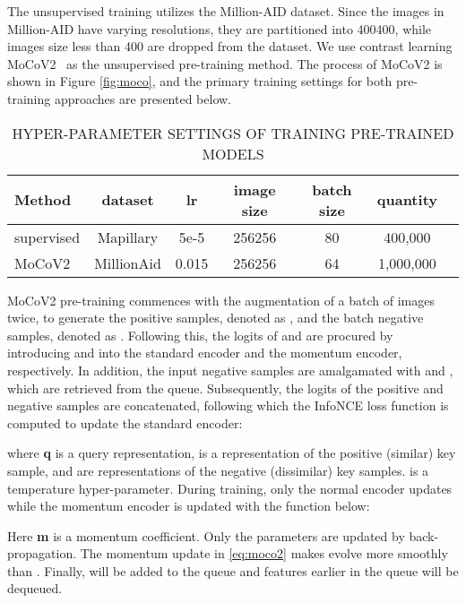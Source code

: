\documentclass[journal]{IEEEtran}
\begin{document}
The unsupervised training utilizes the Million-AID dataset. Since the images in Million-AID have varying resolutions, they are partitioned into 400400, while images size less than 400 are dropped from the dataset. We use contrast learning MoCoV2~\cite{he2020momentum} as the unsupervised pre-training method. The process of MoCoV2 is shown in Figure \ref{fig:moco}, and the primary training settings for both pre-training approaches are presented below.

\begin{table}[!ht]
  \begin{center}
  \scriptsize
    \caption{HYPER-PARAMETER SETTINGS OF TRAINING PRE-TRAINED MODELS}
    \begin{tabular}{l|c c c c c c}
        \hline
      \textbf{Method} & \textbf{dataset} & \textbf{lr} & 
      \textbf{image size} & \textbf{batch size} & \textbf{quantity}\\
      \hline
      supervised & Mapillary & 5e-5 & 256256 & 80 & 400,000\\
      MoCoV2 & MillionAid & 0.015 & 256256 & 64 & 1,000,000\\
      \hline
    \end{tabular}
  \end{center}
  \label{table:2}
\end{table}

MoCoV2 pre-training commences with the augmentation of a batch of images twice, to generate the positive samples, denoted as , and the batch negative samples, denoted as . Following this, the logits of  and  are procured by introducing  and  into the standard encoder and the momentum encoder, respectively. In addition, the input negative samples are amalgamated with  and , which are retrieved from the queue. Subsequently, the logits of the positive and negative samples are concatenated, following which the InfoNCE loss function is computed to update the standard encoder:


where \textbf{q} is a query representation,  is a representation of the positive (similar) key sample, and  are representations of the negative (dissimilar) key samples.  is a temperature hyper-parameter. During training, only the normal encoder updates while the momentum encoder is updated with the function below:

Here \textbf{m}  is a momentum coefficient. Only the parameters  are updated by back-propagation. The momentum update in \ref{eq:moco2} makes  evolve more smoothly than . Finally,  will be added to the queue and features earlier in the queue will be dequeued.
\end{document}
